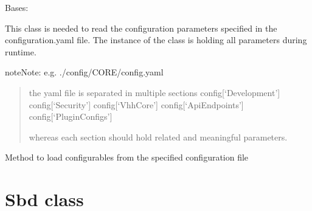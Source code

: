 \documentclass[letterpaper,10pt,english,openany,oneside]{sphinxmanual}
\begin{document}
\begin{fulllineitems}
\label{\detokenize{Configuration:Configuration.Configuration}}
Bases: 

This class is needed to read the configuration parameters specified in the configuration.yaml file.
The instance of the class is holding all parameters during runtime.

\begin{sphinxadmonition}{note}{Note:}
e.g. ./config/CORE/config.yaml
\begin{quote}

the yaml file is separated in multiple sections
config{[}‘Development’{]}
config{[}‘Security’{]}
config{[}‘VhhCore’{]}
config{[}‘ApiEndpoints’{]}
config{[}‘PluginConfigs’{]}

whereas each section should hold related and meaningful parameters.
\end{quote}
\end{sphinxadmonition}

\begin{fulllineitems}
\label{\detokenize{Configuration:Configuration.Configuration.loadConfig}}
Method to load configurables from the specified configuration file

\end{fulllineitems}


\end{fulllineitems}



\section{Sbd class}
\label{\detokenize{Sbd:sbd-class}}\label{\detokenize{Sbd::doc}}
\end{document}

